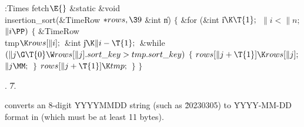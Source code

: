 \Y\B\4:Times fetch\X${}\E{}$\6
\1\1\&{static} \&{void} \\{insertion\_sort}(\&{TimeRow} ${}{*}\\{rows},\39{}$%
\&{int} \|n)\2\2\6
${}\{{}$\1\6
\&{for} (\&{int} \|i${}\K\T{1};{}$ ${}\|i<\|n;{}$ ${}\|i\PP){}$\5
${}\{{}$\1\6
\&{TimeRow} \\{tmp}${}\K\\{rows}[\|i];{}$\6
\&{int} \|j${}\K\|i-\T{1};{}$\7
\&{while} ${}(\|j\G\T{0}\W\\{rows}[\|j].\\{sort\_key}>\\{tmp}.\\{sort\_key}){}$%
\5
${}\{{}$\1\6
${}\\{rows}[\|j+\T{1}]\K\\{rows}[\|j];{}$\6
${}\|j\MM;{}$\6
\4${}\}{}$\2\6
${}\\{rows}[\|j+\T{1}]\K\\{tmp};{}$\6
\4${}\}{}$\2\6
\4${}\}{}$\2\par
{}.
\U7.\fi

 converts an 8-digit \.{YYYYMMDD} string (such as
\.{20230305}) to \.{YYYY-MM-DD} format in  (which must be at
least 11 bytes).

